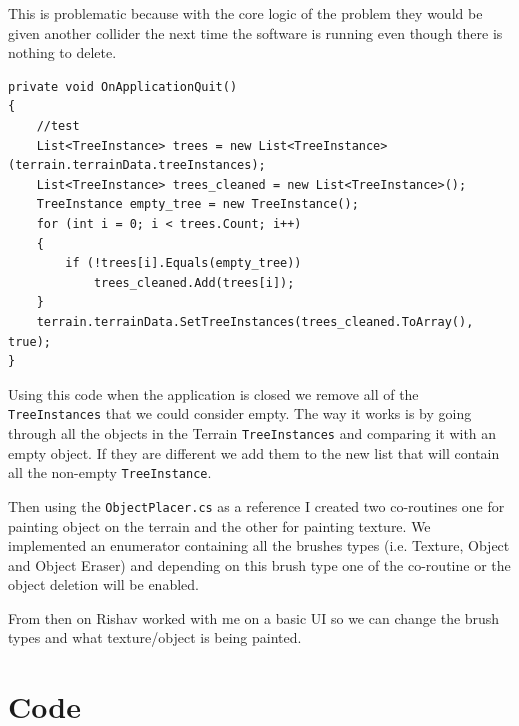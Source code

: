 This is problematic because with the core logic of the problem they would be given another collider the next time the software is running even though there is nothing to delete.

\begin{verbatim}
private void OnApplicationQuit()
{
    //test
    List<TreeInstance> trees = new List<TreeInstance>(terrain.terrainData.treeInstances);
    List<TreeInstance> trees_cleaned = new List<TreeInstance>();
    TreeInstance empty_tree = new TreeInstance();
    for (int i = 0; i < trees.Count; i++)
    {
        if (!trees[i].Equals(empty_tree))
            trees_cleaned.Add(trees[i]);
    }
    terrain.terrainData.SetTreeInstances(trees_cleaned.ToArray(), true);
}
\end{verbatim}

Using this code when the application is closed we remove all of the \texttt{TreeInstances} that we could consider empty. The way it works is by going through all the objects in the Terrain \texttt{TreeInstances}  and comparing it with an empty object. If they are different we add them to the new list that will contain all the non-empty \texttt{TreeInstance}.

Then using the \texttt{ObjectPlacer.cs} as a reference I created two co-routines one for painting object on the terrain and the other for painting texture. We implemented an enumerator containing all the brushes types (i.e. Texture, Object and Object Eraser) and depending on this brush type one of the co-routine or the object deletion will be enabled.

From then on Rishav worked with me on a basic UI so we can change the brush types and what texture/object is being painted.

\section{Code} \label{sec:appendix-b}
